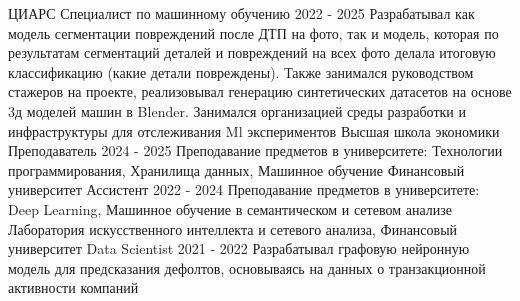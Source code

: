 \documentclass[]{awesome-cv}
\begin{document}
\begin{cventries}
    \cventry
    {ЦИАРС}
    {Специалист по машинному обучению}
    {}
    {2022 - 2025}
    {Разрабатывал как модель сегментации повреждений после ДТП на фото, так и модель, которая по результатам сегментаций деталей и повреждений на всех фото делала итоговую классификацию (какие детали повреждены). Также занимался руководством стажеров на проекте, реализовывал генерацию синтетических датасетов на основе 3д моделей машин в Blender. Занимался организацией среды разработки и инфраструктуры для отслеживания Ml экспериментов}
	\cventry
    {Высшая школа экономики}
    {Преподаватель}
    {}
    {2024 - 2025}
    {Преподавание предметов в университете: Технологии программирования, Хранилища данных, Машинное обучение}
	\cventry
    {Финансовый университет}
    {Ассистент}
    {}
    {2022 - 2024}
    {Преподавание предметов в университете: Deep Learning, Машинное обучение в семантическом и сетевом анализе}
	\cventry
    {Лаборатория искусственного интеллекта и сетевого анализа, Финансовый университет}
    {Data Scientist}
    {}
    {2021 - 2022}
    {Разрабатывал графовую нейронную модель для предсказания дефолтов, основываясь на данных о транзакционной активности компаний}
\end{cventries}
\end{document}
